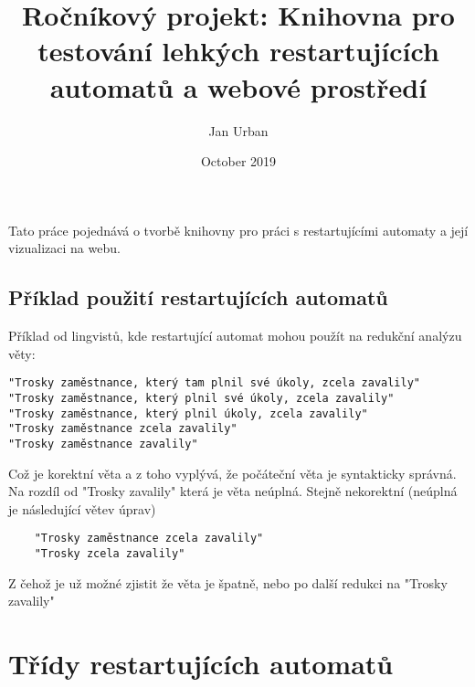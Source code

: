 \documentclass{article}
\title{ Ročníkový projekt: Knihovna pro testování lehkých restartujících automatů a webové prostředí}
\author{Jan Urban }
\date{October 2019}
\begin{document}
\maketitle

Tato práce pojednává o tvorbě knihovny pro práci s restartujícími automaty a její vizualizaci na webu.
\subsection{Příklad použití restartujících automatů}
Příklad od lingvistů, kde restartující automat mohou použít na redukční analýzu věty:

\begin{verbatim}
"Trosky zaměstnance, který tam plnil své úkoly, zcela zavalily"
"Trosky zaměstnance, který plnil své úkoly, zcela zavalily"
"Trosky zaměstnance, který plnil úkoly, zcela zavalily"
"Trosky zaměstnance zcela zavalily"
"Trosky zaměstnance zavalily"
\end{verbatim}

Což je korektní věta a z toho vyplývá, že počáteční věta je syntakticky správná. Na rozdíl od
"Trosky zavalily" která je věta neúplná. Stejně nekorektní (neúplná je následující větev úprav)

\begin{verbatim}
	"Trosky zaměstnance zcela zavalily"
	"Trosky zcela zavalily"
\end{verbatim}

Z čehož je už možné zjistit že věta je špatně, nebo po další redukci na "Trosky zavalily"

\section{Třídy restartujících automatů}
\end{document}
